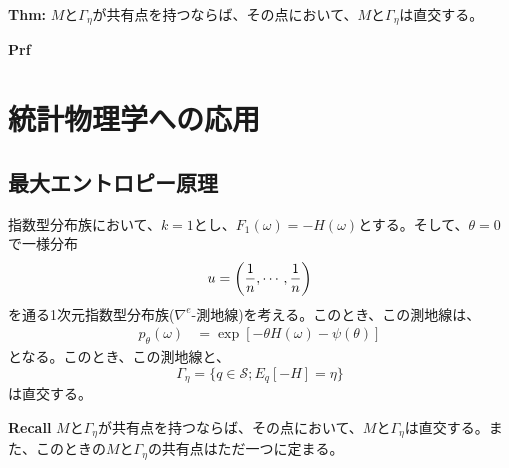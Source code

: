 \documentclass[a4paper,11pt]{jsarticle}
\numberwithin{equation}{section}
\begin{document}
\begin{itembox}[l]{\textbf{Thm:}}
    $M$と$\Gamma_{\eta}$が共有点を持つならば、その点において、$M$と$\Gamma_{\eta}$は直交する。
\end{itembox}
\textbf{Prf}\\

\section{統計物理学への応用}
\subsection{最大エントロピー原理}
指数型分布族において、$k=1$とし、$F_1(\omega) = -H(\omega)$とする。そして、$\theta = 0$で一様分布
\begin{equation}
    u = \qty(\frac{1}{n},\cdots,\frac{1}{n})
\end{equation}
を通る1次元指数型分布族($\nabla^{e}$-測地線)を考える。このとき、この測地線は、
\begin{align}
    p_{\theta}(\omega) &= \exp\left[ -\theta H(\omega) - \psi(\theta) \right]
\end{align}
となる。このとき、この測地線と、
\begin{equation}
    \Gamma_{\eta} = \{q \in \mathcal{S}; E_q[-H] = \eta \}
\end{equation}
は直交する。

\begin{itembox}[l]{\textbf{Recall}}
    $M$と$\Gamma_{\eta}$が共有点を持つならば、その点において、$M$と$\Gamma_{\eta}$は直交する。また、このときの$M$と$\Gamma_{\eta}$の共有点はただ一つに定まる。
\end{itembox}
\end{document}
